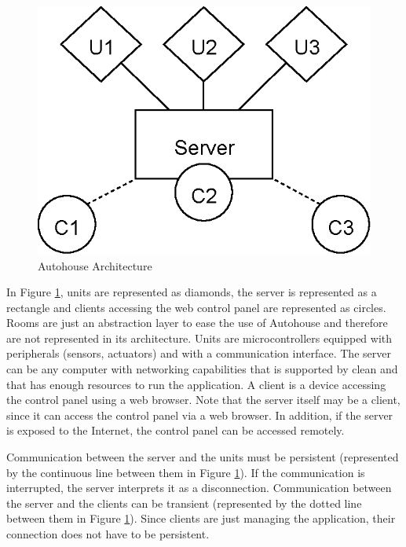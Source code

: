 \begin{figure}[H]
\begin{center}
\includegraphics[scale=1.0]{thesis/img/autohouse_arch.eps}
\end{center}
\caption{Autohouse Architecture}
\label{fig:autohouse_arch}
\end{figure}

In Figure \ref{fig:autohouse_arch}, units are represented as diamonds, the server is represented as a rectangle and clients accessing the web control panel are represented as circles. Rooms are just an abstraction layer to ease the use of Autohouse and therefore are not represented in its architecture. Units are microcontrollers equipped with peripherals (sensors, actuators) and with a communication interface. The server can be any computer with networking capabilities that is supported by \gls{clean} and that has enough resources to run the application. A client is a device accessing the control panel using a web browser. Note that the server itself may be a client, since it can access the control panel via a web browser. In addition, if the server is exposed to the Internet, the control panel can be accessed remotely. 

Communication between the server and the units must be persistent (represented by the continuous line between them in Figure \ref{fig:autohouse_arch}). If the communication is interrupted, the server interprets it as a disconnection. Communication between the server and the clients can be transient (represented by the dotted line between them in Figure \ref{fig:autohouse_arch}). Since clients are just managing the application, their connection does not have to be persistent. 

